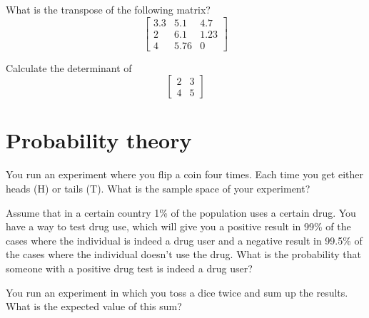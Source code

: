 \documentclass[10pt]{article}
\newenvironment{problem}[2][Problem]{\begin{trivlist}
\item[\hskip \labelsep {\bfseries #1}\hskip \labelsep {\bfseries #2.}]}{\end{trivlist}}
\begin{document}
\begin{problem}{4.3}
What is the transpose of the following matrix?
$$\begin{bmatrix}3.3 & 5.1 & 4.7\\ 2 & 6.1 & 1.23 \\ 4 & 5.76 & 0\end{bmatrix}$$
\end{problem}

\begin{problem}{4.4}
Calculate the determinant of
$$\begin{bmatrix}2 & 3 \\ 4 & 5 \end{bmatrix} $$
\end{problem}

\section{Probability theory}

\begin{problem}{5.1}
You run an experiment where you flip a coin four times. Each time you get either heads (H) or tails (T). What is the sample space of your experiment?
\end{problem}

\begin{problem}{5.2}
Assume that in a certain country 1\% of the population uses a certain drug. You have a way to test drug use, which will give you a positive result in 99\% of the cases where the individual is indeed a drug user and a negative result in 99.5\% of the cases where the individual doesn't use the drug. What is the probability that someone with a positive drug test is indeed a drug user?
\end{problem}

\begin{problem}{5.3}
You run an experiment in which you toss a dice twice and sum up the results. What is the expected value of this sum?
\end{problem}
\end{document}
